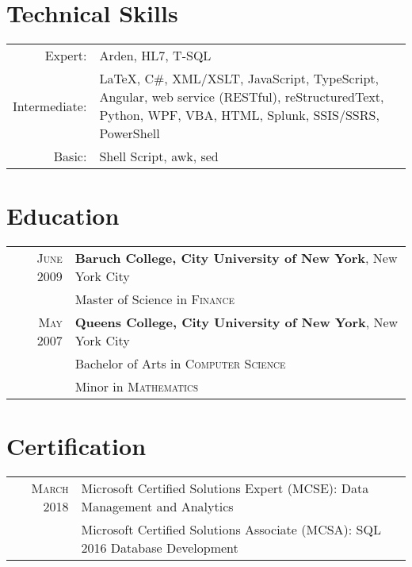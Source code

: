 \documentclass[letter,11pt,DIV=20]{scrartcl}
\begin{document}
\section{Technical Skills}
\begin{tabu}{rX}
Expert:& Arden, HL7, T-SQL \\
Intermediate:& LaTeX, C\#, XML/XSLT, JavaScript, TypeScript, Angular, web service (RESTful), reStructuredText, Python, WPF, VBA, HTML, Splunk, SSIS/SSRS, PowerShell \\
 Basic:& Shell Script, awk, sed 
\end{tabu}

\section{Education}
\begin{tabular}{rl}	
 \textsc{June} 2009 & \textbf{Baruch College, City University of New York}, New York City \\
 & Master of Science in \textsc{Finance} \\
\textsc{May} 2007& \textbf{Queens College, City University of New York}, New York City \\
& Bachelor of Arts in \textsc{Computer Science} \\
& Minor in \textsc{Mathematics}  \\
\end{tabular}

\section{Certification}
\begin{tabular}{rl}	
 \textsc{March} 2018 & Microsoft Certified Solutions Expert (MCSE): Data Management and Analytics \\
  & Microsoft Certified Solutions Associate (MCSA): SQL 2016 Database Development \\
\end{tabular}
\end{document}
